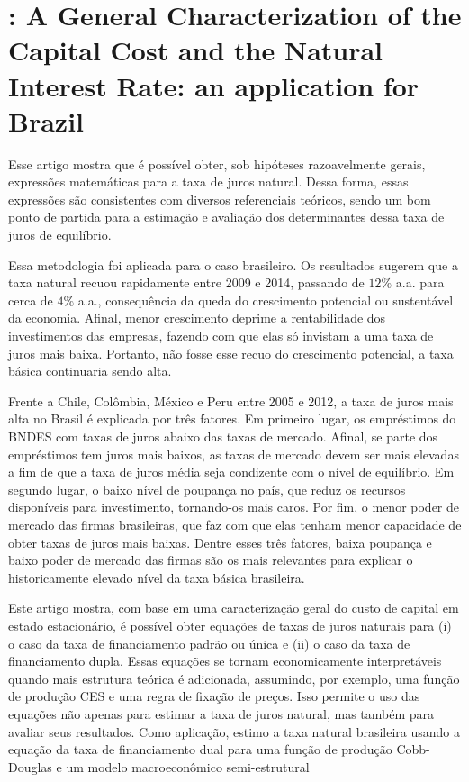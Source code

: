 \section{\citet{Trafane:2020}: A General Characterization of the Capital Cost and the Natural Interest Rate: an application for Brazil}
Esse artigo mostra que é possível obter, sob hipóteses razoavelmente gerais,
expressões matemáticas para a taxa de juros natural. Dessa forma, essas expressões são consistentes com diversos referenciais teóricos, sendo um bom ponto de partida para a estimação e avaliação dos determinantes dessa taxa de juros de equilíbrio.

Essa metodologia foi aplicada para o caso brasileiro. Os resultados sugerem que
a taxa natural recuou rapidamente entre 2009 e 2014, passando de $12\%$ a.a. para cerca de $4\%$ a.a., consequência da queda do crescimento potencial ou sustentável da economia. Afinal, menor crescimento deprime a rentabilidade dos investimentos das empresas, fazendo com que elas só invistam a uma taxa de juros mais baixa. Portanto, não fosse esse recuo do crescimento potencial, a taxa básica continuaria sendo alta.

Frente a Chile, Colômbia, México e Peru entre 2005 e 2012, a taxa de juros mais
alta no Brasil é explicada por três fatores. Em primeiro lugar, os empréstimos do BNDES com taxas de juros abaixo das taxas de mercado. Afinal, se parte dos empréstimos tem juros mais baixos, as taxas de mercado devem ser mais elevadas a fim de que a taxa de juros média seja condizente com o nível de equilíbrio. Em segundo lugar, o baixo nível de poupança no país, que reduz os recursos disponíveis para investimento, tornando-os mais caros. Por fim, o menor poder de mercado das firmas brasileiras, que faz com que elas tenham menor capacidade de obter taxas de juros mais baixas. Dentre esses três fatores, baixa poupança e baixo poder de mercado das firmas são os mais relevantes para explicar o historicamente elevado nível da taxa básica brasileira.

Este artigo mostra, com base em uma caracterização geral do custo de capital em estado estacionário, é possível obter equações de taxas de juros naturais para (i) o caso da taxa de financiamento padrão ou única e (ii) o caso da taxa de financiamento dupla. Essas equações se tornam economicamente interpretáveis quando mais estrutura teórica é adicionada, assumindo, por exemplo, uma função de produção CES e uma regra de fixação de preços. Isso permite o uso das equações não apenas para estimar a taxa de juros natural, mas também para avaliar seus resultados. Como aplicação, estimo a taxa natural brasileira usando a equação da taxa de financiamento dual para uma função de produção Cobb-Douglas e um modelo macroeconômico semi-estrutural


%
%
%




